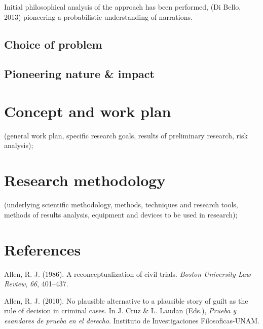 \documentclass[11pt,dvipsnames,enabledeprecatedfontcommands]{scrartcl}
\begin{document}
Initial philosophical analysis of the approach has been performed, (Di
Bello, 2013) pioneering a probabilistic understanding of narrations.


\hypertarget{choice-of-problem}{%
\subsection{Choice of problem}\label{choice-of-problem}}

\hypertarget{pioneering-nature-impact}{%
\subsection{Pioneering nature \&
impact}\label{pioneering-nature-impact}}

\hypertarget{concept-and-work-plan}{%
\section{Concept and work plan}\label{concept-and-work-plan}}

(general work plan, specific research goals, results of preliminary
research, risk analysis);

\hypertarget{research-methodology}{%
\section{Research methodology}\label{research-methodology}}

(underlying scientific methodology, methods, techniques and research
tools, methods of results analysis, equipment and devices to be used in
research);

\hypertarget{references}{%
\section*{References}\label{references}}

\hypertarget{refs}{}
\leavevmode\hypertarget{ref-Allen1986A-Reconceptuali}{}%
Allen, R. J. (1986). A reconceptualization of civil trials. \emph{Boston
University Law Review}, \emph{66}, 401--437.

\leavevmode\hypertarget{ref-Allen2010No-Plausible-Al}{}%
Allen, R. J. (2010). No plausible alternative to a plausible story of
guilt as the rule of decision in criminal cases. In J. Cruz \& L. Laudan
(Eds.), \emph{Prueba y esandares de prueba en el derecho}. Instituto de
Investigaciones Filosoficas-UNAM.
\end{document}
